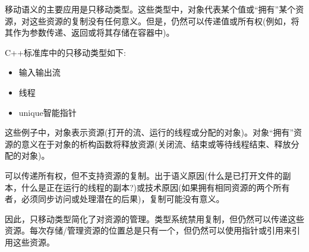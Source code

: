 移动语义的主要应用是只移动类型。这些类型中，对象代表某个值或“拥有”某个资源，对这些资源的复制没有任何意义。但是，仍然可以传递值或所有权(例如，将其作为参数传递、返回或将其存储在容器中)。

C++标准库中的只移动类型如下:

\begin{itemize}
	\item 输入输出流
	\item 线程
	\item unique智能指针
\end{itemize}

这些例子中，对象表示资源(打开的流、运行的线程或分配的对象)。对象“拥有”资源的意义在于对象的析构函数将释放资源(关闭流、结束或等待线程结束、释放分配的对象)。

可以传递所有权，但不支持资源的复制。出于语义原因(什么是已打开文件的副本，什么是正在运行的线程的副本?)或技术原因(如果拥有相同资源的两个所有者，必须同步访问或处理潜在的后果)，复制可能没有意义。

因此，只移动类型简化了对资源的管理。类型系统禁用复制，但仍然可以传递这些资源。每次存储/管理资源的位置总是只有一个，但仍然可以使用指针或引用来引用这些资源。
























































